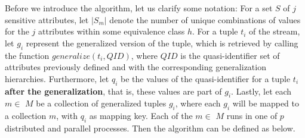 \noindent Before we introduce the algorithm, let us clarify some notation: For a set $S$ of $j$ sensitive attributes, let $|S_m|$ denote the number of unique combinations of values for the $j$ attributes within some equivalence class $h$. For a tuple $t_i$ of the stream, let $g_i$ represent the generalized version of the tuple, which is retrieved by calling the function $generalize(t_i,QID)$, where $QID$ is the quasi-identifier set of attributes previously defined and with the corresponding generalization hierarchies. Furthermore, let $q_i$ be the values of the quasi-identifier for a tuple $t_i$ \textbf{after the generalization}, that is, these values are part of $g_i$. Lastly, let each $m \in $ $M$ be a collection of generalized tuples $g_i$, where each $g_i$ will be mapped to a collection $m$, with $q_i$ as mapping key. Each of the $m \in $ $M$  runs in one of $p$ distributed and parallel processes. Then the algorithm can be defined as below.

